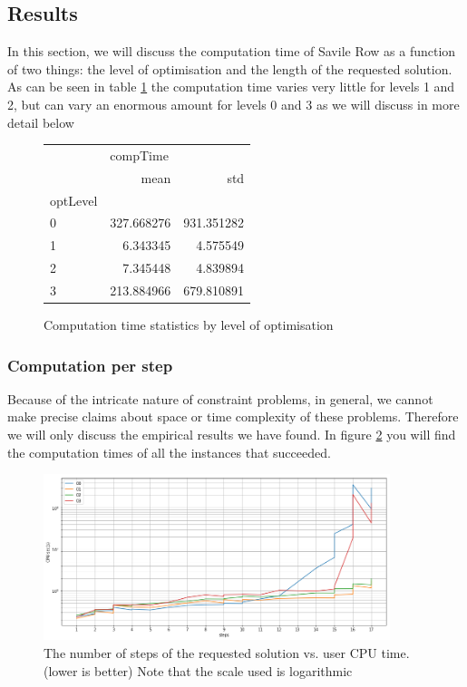 \documentclass[british]{article}
\begin{document}
	\subsection{Results}
	In this section, we will discuss the computation time of Savile Row as a function of two things: the level of optimisation and the length of the requested solution. As can be seen in table \ref{compstats} the computation time varies very little for levels 1 and 2, but can vary an enormous amount for levels 0 and 3 as we will discuss in more detail below 
	\begin{figure}[!h]
		\centering
		\begin{tabular}{lrr}
			\toprule
			{} & \multicolumn{2}{l}{compTime} \\
			{} &        mean &         std \\
			optLevel &             &             \\
			\midrule
			0        &  327.668276 &  931.351282 \\
			1        &    6.343345 &    4.575549 \\
			2        &    7.345448 &    4.839894 \\
			3        &  213.884966 &  679.810891 \\
			\bottomrule
		\end{tabular}
		\caption{Computation time statistics by level of optimisation}
		\label{compstats}	
		
	\end{figure}
	
	\subsubsection{Computation per step}
	Because of the intricate nature of constraint problems, in general, we cannot make precise claims about space or time complexity of these problems. Therefore we will only discuss the empirical results we have found. In figure \ref{stepsVsCPUSec} you will find the computation times of all the instances that succeeded.
	\FloatBarrier
	\begin{figure}[!ht]
		\centering
		\includegraphics[width=0.9\textwidth]{stepsVsCPUSec}
		\caption{The number of steps of the requested solution vs. user CPU time. (lower is better) Note that the scale used is logarithmic}
		\label{stepsVsCPUSec}	
	\end{figure}
	\FloatBarrier 
	
\end{document}
